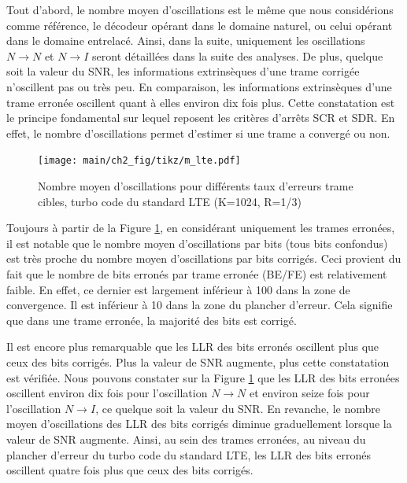Tout d'abord, le nombre moyen d'oscillations est le même que nous considérions comme référence, le décodeur opérant dans le 
domaine naturel, ou celui opérant dans le domaine entrelacé. Ainsi, dans la suite, uniquement les oscillations $N\rightarrow N$ 
et $N\rightarrow I$ seront détaillées dans la suite des analyses.
De plus, quelque soit la valeur du SNR, les informations extrinsèques d'une trame corrigée n'oscillent pas ou très 
peu. En comparaison, les informations extrinsèques d'une trame erronée oscillent quant à elles environ dix fois plus.
Cette constatation est le principe fondamental sur lequel reposent les critères d'arrêts SCR et SDR. En effet, le nombre 
d'oscillations permet d'estimer si une trame a convergé ou non.

\begin{figure}[tb]
	\begin{center}
	\texttt{[image: main/ch2\_fig/tikz/m\_lte.pdf]}
	\caption{Nombre moyen d'oscillations pour différents taux d'erreurs trame cibles, turbo code du standard LTE (K=1024, R=1/3) \label{ch2:fig:meanlte}}
	\end{center}
\end{figure}

Toujours à partir de la Figure \ref{ch2:fig:meanlte}, en considérant uniquement les trames erronées, il est notable que le nombre moyen 
d’oscillations par bits (tous bits confondus) est très proche du nombre moyen d’oscillations par bits corrigés. Ceci 
provient du fait que le nombre de bits erronés par trame erronée (BE/FE) est relativement faible. En effet, ce dernier 
est largement inférieur à 100 dans la zone de convergence. Il est inférieur à 10 dans la zone du plancher d'erreur. Cela
signifie que dans une trame erronée, la majorité des bits est corrigé. 

Il est encore plus remarquable que les LLR des bits erronés oscillent plus que ceux des bits corrigés. Plus la valeur de SNR augmente, 
plus cette constatation est vérifiée. Nous pouvons constater sur la Figure \ref{ch2:fig:meanlte} que les LLR des bits erronées 
oscillent environ dix fois pour l'oscillation $N\rightarrow N$ et environ seize fois pour 
l'oscillation $N\rightarrow I$, ce quelque soit la valeur du SNR. En revanche, le nombre moyen d'oscillations des LLR des bits corrigés 
diminue graduellement lorsque la valeur de SNR augmente. Ainsi, au sein des trames erronées, au niveau du plancher d'erreur 
du turbo code du standard LTE, les LLR des bits erronés oscillent quatre fois plus que ceux des bits corrigés.

